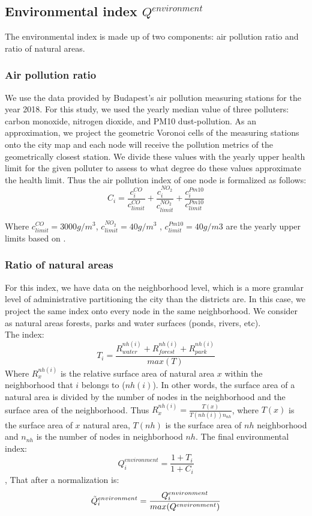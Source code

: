 \subsection{Environmental index $Q^{environment}$} \label{environment}
The environmental index is made up of two components: air pollution ratio and ratio of natural areas.

\subsubsection{Air pollution ratio}
We use the data provided by Budapest’s air pollution measuring stations for the year 2018. For this study, we used the yearly median value of three polluters: carbon monoxide, nitrogen dioxide, and PM10 dust-pollution.
As an approximation, we project the geometric Voronoi cells of the measuring stations onto the city map and each node will receive the pollution metrics of the geometrically closest station. We divide these values with the yearly upper health limit for the given polluter to assess to what degree do these values approximate the health limit. Thus the air pollution index of one node is formalized as follows:
$$C_i=\frac{c_i^{CO}}{c_{limit}^{CO}}+\frac{c_i^{NO_2}}{c_{limit}^{NO_2}}+\frac{c_i^{Pm10}}{c_{limit}^{Pm10}}$$

Where $c^{CO}_{limit}=3000 g/m^3$, $c^{NO_2}_{limit}=40 g/m^3$ , $c^{Pm10}_{limit}=40 g/m3$ are the yearly upper limits based on \cite{levegominoseg}.

\subsubsection{Ratio of natural areas}
For this index, we have data on the neighborhood level, which is a more granular level of administrative partitioning the city than the districts are. In this case, we project the same index onto every node in the same neighborhood. We consider as natural areas forests, parks and water surfaces (ponds, rivers, etc). \\
The index:
$$T_i=\frac{R_{water}^{nh(i)}+ R_{forest}^{nh(i)}+R_{park}^{nh(i)}}{max(T)}$$
Where $R_x^{nh(i)}$ is the relative surface area of natural area $x$ within the neighborhood that $i$ belongs to ($nh(i)$). In other words, the surface area of a natural area is divided by the number of nodes in the neighborhood and the surface area of the neighborhood. Thus
$R_x^{nh(i)}=\frac{T(x)}{T(nh(i))n_{nh}}$, where $T(x)$ is the surface area of $x$ natural area, $T(nh)$ is the surface area of $nh$ neighborhood and $n_{nh}$ is the number of nodes in neighborhood $nh$.
The final environmental index:
$$Q_i^{environment}=\frac{1+T_i}{1+C_i}$$,
That after a normalization is:
$$\Tilde{Q}_i^{environment}=\frac{Q_i^{environment}}{max(Q^{environment})}$$


